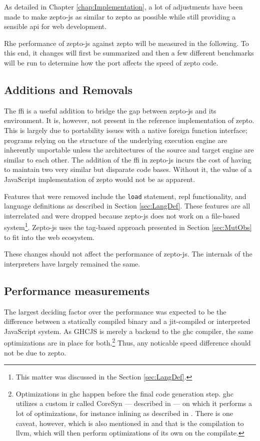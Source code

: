 \documentclass[oneside,11pt,xetex]{scrbook}
\begin{document}
As detailed in Chapter \ref{chap:Implementation}, a lot of adjustments have been made
to make zepto-js as similar to zepto as possible while still providing a sensible \gls{api}
for web development.

Rhe performance of zepto-js against zepto will be measured in the following.
To this end, it  changes will first be summarized and then a few different
benchmarks will be run to determine how the port affects the speed of zepto
code.

\subsection{Additions and Removals}

The \gls{ffi} is a useful addition to bridge the gap between zepto-js and its
environment. It is, however, not present in the reference implementation of zepto.
This is largely due to portability issues with a native foreign function interface;
programs relying on the structure of the underlying execution engine are inherently
unportable unless the architectures of the source and target engine are similar to
each other. The addition of the \gls{ffi} in zepto-js incurs the cost of having to
maintain two very similar but disparate code bases. Without it, the value of a
JavaScript implementation of zepto would not be as apparent.

Features that were removed include the \texttt{load} statement, \gls{repl} functionality,
and language definitions as described in Section \ref{sec:LangDef}. These features
are all interrelated and were dropped because zepto-js does not work on a file-based
system\footnote{This matter was discussed in the Section \ref{sec:LangDef}.}. Zepto-js
uses the tag-based approach presented in Section \ref{sec:MutObs} to fit into the web
ecosystem.

These changes should not affect the performance of zepto-js. The internals of the
interpreters have largely remained the same.

\subsection{Performance measurements}

The largest deciding factor over the performance was expected to be the difference
between a statically compiled binary and a \gls{jit}-compiled or interpreted
JavaScript system. As GHCJS is merely a backend to the \gls{ghc} compiler, the
same optimizations are in place for both.\footnote{Optimizations in \gls{ghc} happen
before the final code generation step. \gls{ghc} utilizes a custom \gls{ir} called
CoreSyn --- described in \cite{CORE} --- on which it performs a lot of optimizations,
for instance inlining as described in \cite{SECR}. There is one caveat, however, which
is also mentioned in \cite{CORE} and that is the compilation to \gls{llvm}, which will
then perform optimizations of its own on the compilate.} Thus, any noticable speed difference
should not be due to zepto.
\end{document}
